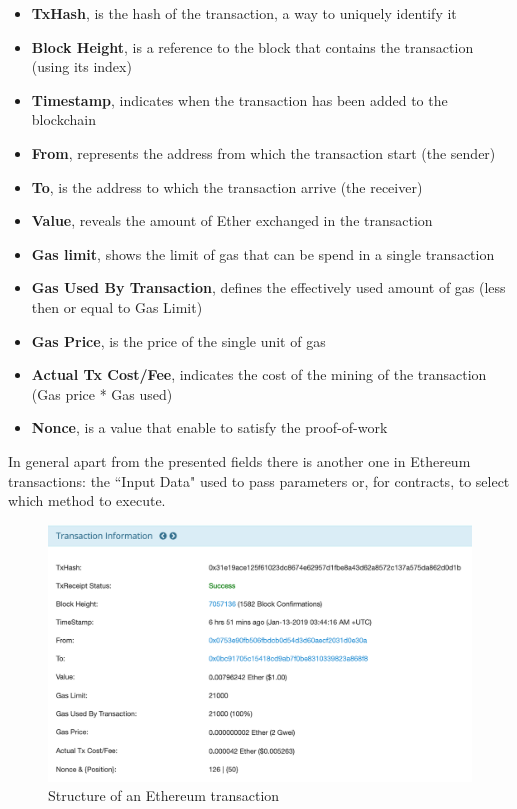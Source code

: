 \begin{itemize}
    \item \textbf{TxHash}, is the hash of the transaction, a way to uniquely identify it
    \item \textbf{Block Height}, is a reference to the block that contains the transaction (using its index)
    \item \textbf{Timestamp}, indicates when the transaction has been added to the blockchain
    \item \textbf{From}, represents the address from which the transaction start (the sender)
    \item \textbf{To}, is the address to which the transaction arrive (the receiver)
    \item \textbf{Value}, reveals the amount of Ether exchanged in the transaction
    \item \textbf{Gas limit}, shows the limit of gas that can be spend in a single transaction
    \item \textbf{Gas Used By Transaction}, defines the effectively used amount of gas (less then or equal to Gas Limit)
    \item \textbf{Gas Price}, is the price of the single unit of gas
    \item \textbf{Actual Tx Cost/Fee}, indicates the cost of the mining of the transaction (Gas price * Gas used)
    \item \textbf{Nonce}, is a value that enable to satisfy the proof-of-work
\end{itemize}

In general apart from the presented fields there is another one in Ethereum transactions: the ``Input Data" used to pass 
parameters or, for contracts, to select which method to execute.

\begin{figure}[!ht]
    \centering
\includegraphics[width=\textwidth]{images/transactions_structure.png}
    \caption{Structure of an Ethereum transaction}
    \label{images:transactions_structure}
\end{figure}



